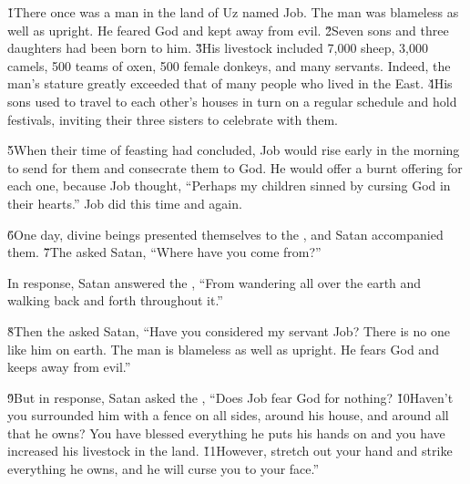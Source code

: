 


\v{1}There once was a man in the land of Uz named Job. The man was blameless as well as upright. He feared God and kept away from evil. \v{2}Seven sons and three daughters had been born to him. \v{3}His livestock included 7,000 sheep, 3,000 camels, 500 teams of oxen, 500 female donkeys, and many servants. Indeed, the man's stature greatly exceeded that of many people who lived in the East. \v{4}His sons used to travel to each other's houses in turn on a regular schedule and hold festivals, inviting their three sisters to celebrate with them.

\v{5}When their time of feasting had concluded, Job would rise early in the morning to send for them and consecrate them to God. He would offer a burnt offering for each one, because Job thought, ``Perhaps my children sinned by cursing God in their hearts.'' Job did this time and again.

\v{6}One day, divine beings presented themselves to the , and Satan accompanied them. \v{7}The  asked Satan, ``Where have you come from?''

In response, Satan answered the , ``From wandering all over the earth and walking back and forth throughout it.''

\v{8}Then the  asked Satan, ``Have you considered my servant Job? There is no one like him on earth. The man is blameless as well as upright. He fears God and keeps away from evil.''

\v{9}But in response, Satan asked the , ``Does Job fear God for nothing? \v{10}Haven't you surrounded him with a fence on all sides, around his house, and around all that he owns? You have blessed everything he puts his hands on and you have increased his livestock in the land. \v{11}However, stretch out your hand and strike everything he owns, and he will curse you to your face.''


